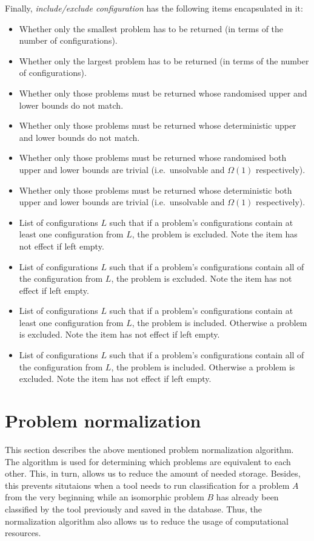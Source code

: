 Finally, \emph{include/exclude configuration} has the following
items encapsulated in it:

\begin{itemize}
  \item Whether only the smallest problem has to be returned (in terms of the number of configurations).
  \item Whether only the largest problem has to be returned (in terms of the number of configurations).
  \item Whether only those problems must be returned whose randomised upper
  and lower bounds do not match.
  \item Whether only those problems must be returned whose deterministic upper
  and lower bounds do not match.
  \item Whether only those problems must be returned whose randomised both
  upper and lower bounds are trivial (i.e.\ unsolvable and $\Omega(1)$
  respectively).
  \item Whether only those problems must be returned whose deterministic both
  upper and lower bounds are trivial (i.e.\ unsolvable and $\Omega(1)$
  respectively).
  \item List of configurations $L$ such that if a problem's configurations contain at least one configuration from $L$, the problem is excluded. Note
  the item has not effect if left empty.
  \item List of configurations $L$ such that if a problem's configurations contain all of the configuration from $L$, the problem is excluded. Note
  the item has not effect if left empty.
  \item List of configurations $L$ such that if a problem's configurations contain at least one configuration from $L$, the problem is included.
  Otherwise a problem is excluded.
  Note
  the item has not effect if left empty.
  \item List of configurations $L$ such that if a problem's configurations contain all of the configuration from $L$, the problem is included.
  Otherwise a problem is excluded.
  Note
  the item has not effect if left empty.
\end{itemize}

\section{Problem normalization}
\label{section:problem-normalization}

This section describes the above mentioned problem normalization
algorithm. The algorithm is used for determining which problems
are equivalent to each other. This, in turn, allows us
to reduce the amount of needed storage. Besides, this prevents
situtaions when a tool needs to run classification for a problem $A$
from the very beginning while an isomorphic problem $B$ has already been classified
by the tool previously and saved in the database. Thus, the normalization
algorithm also allows us to reduce the usage of computational resources.

